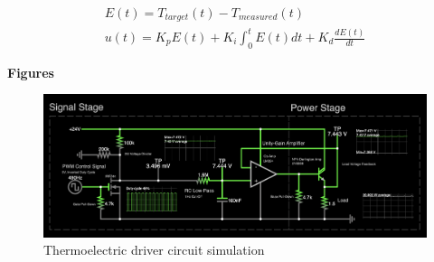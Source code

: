 \begin{gather}
    \label{eqn:piderror}
    E(t)=T_{target}(t)-T_{measured}(t)\\
    \label{eqn:pid}
    u(t)=K_pE(t)+K_i\int_0^{t}E(t)dt+K_d\frac{dE(t)}{dt}
\end{gather}

\textbf{Figures}

\begin{figure}[h!]
  \centering
  \includegraphics[width=\textwidth]{../assets/figures/airthermoregulation_simulation.png}
  \hfill
  \caption{Thermoelectric driver circuit simulation \cite{thermo-falstad}}
  \label{fig:peltierdriver}
\end{figure}

